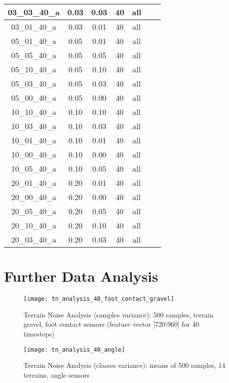 \begin{table}[H]
\begin{tabular}{|c|c|c|c|c|c|c|}
03\_03\_40\_a	& 0.03	& 0.03	& 40	& all	 \\ \hline
03\_01\_40\_a	& 0.03	& 0.01	& 40	& all	 \\ \hline
05\_01\_40\_a	& 0.05	& 0.01	& 40	& all	 \\ \hline
05\_05\_40\_a	& 0.05	& 0.05	& 40	& all	 \\ \hline
05\_10\_40\_a	& 0.05	& 0.10	& 40	& all	 \\ \hline
05\_03\_40\_a	& 0.05	& 0.03	& 40	& all	 \\ \hline
05\_00\_40\_a	& 0.05	& 0.00	& 40	& all	 \\ \hline
10\_10\_40\_a	& 0.10	& 0.10	& 40	& all	 \\ \hline
10\_03\_40\_a	& 0.10	& 0.03	& 40	& all	 \\ \hline
10\_01\_40\_a	& 0.10	& 0.01	& 40	& all	 \\ \hline
10\_00\_40\_a	& 0.10	& 0.00	& 40	& all	 \\ \hline
10\_05\_40\_a	& 0.10	& 0.05	& 40	& all	 \\ \hline
20\_01\_40\_a	& 0.20	& 0.01	& 40	& all	 \\ \hline
20\_00\_40\_a	& 0.20	& 0.00	& 40	& all	 \\ \hline
20\_05\_40\_a	& 0.20	& 0.05	& 40	& all	 \\ \hline
20\_10\_40\_a	& 0.20	& 0.10	& 40	& all	 \\ \hline
20\_03\_40\_a	& 0.20	& 0.03	& 40	& all	 \\ \hline

\end{tabular}
\end{table}

\section{Further Data Analysis} \label{sec:further_data_analysis}

\begin{figure}[H]
  \centering
  \texttt{[image: tn\_analysis\_40\_foot\_contact\_gravel]}
  \caption{Terrain Noise Analysis (samples variance): 500 samples, terrain gravel, foot contact sensors (feature vector [720:960] for 40 timesteps)}
  \label{fig:tn_analysis_foot_contact_gravel}
\end{figure}

\begin{figure}[H]
  \centering
  \texttt{[image: tn\_analysis\_40\_angle]}
  \caption{Terrain Noise Analysis (classes variance): means of 500 samples, 14 terrains, angle sensors}
  \label{fig:tn_analysis_angle}
\end{figure}

